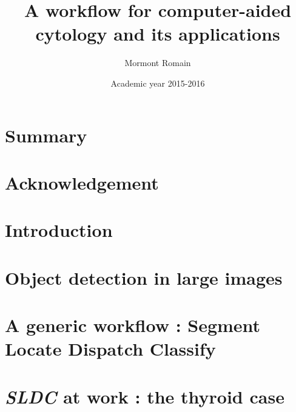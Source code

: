 \documentclass[a4paper,11pt]{report}
\author{Mormont Romain}
\title{A workflow for computer-aided cytology and its applications}
\date{Academic year 2015-2016}
\begin{document}
	
	
	
	\newpage
	
	\tableofcontents
	
	\newpage

	\chapter*{Summary}
	
	\newpage
	
	\chapter*{Acknowledgement}
	
	\newpage
	
	\setcounter{page}{1}
	\chapter{Introduction}
	
	\newpage
	
	\chapter{Object detection in large images}
	
	\newpage
	
	\chapter{A generic workflow : Segment Locate Dispatch Classify}
	
	\newpage
	
	\chapter{\textit{SLDC} at work : the thyroid case}
	
	\newpage
	
\end{document}
